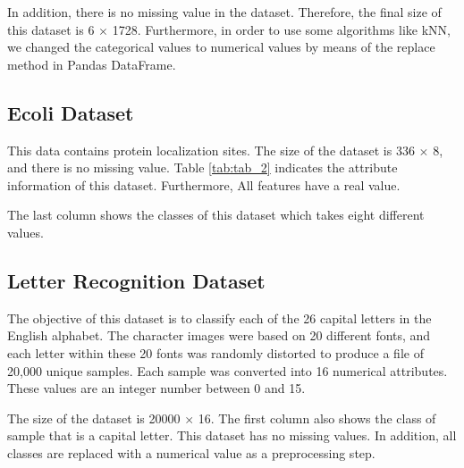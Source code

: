 \begin{table}[H]
\centering
\caption{The attribute information of Car Evaluation dataset.}
\label{tab:tab_1}

\end{table}

In addition, there is no missing value in the dataset. Therefore, the final size of this dataset is 6 $\times$ 1728. Furthermore, in order to use some algorithms like kNN, we changed the categorical values to numerical values by means of the replace method in Pandas DataFrame. 




\subsection{Ecoli Dataset}
This data contains protein localization sites. The size of the dataset is 336 $\times$ 8, and there is no missing value. Table \ref{tab:tab_2} indicates the attribute information of this dataset. Furthermore, All features have a real value.

\begin{table}[H]
\centering
\caption{The attribute information of Ecoli dataset.}
\label{tab:tab_2}

\end{table}

The last column shows the classes of this dataset which takes eight different values.




\subsection{Letter Recognition Dataset}

The objective of this dataset is to classify each of the 26 capital letters in the English alphabet. The character images were based on 20 different fonts, and each letter within these 20 fonts was randomly distorted to produce a file of 20,000 unique samples. Each sample was converted into 16 numerical attributes. These values are an integer number between 0 and 15. 

\begin{table}[H]
\centering
\caption{The attribute information of letter recognition dataset.}
\label{tab:tab_3}

\end{table}

The size of the dataset is 20000 $\times$ 16. The first column also shows the class of sample that is a capital letter. This dataset has no missing values. In addition, all classes are replaced with a numerical value as a preprocessing step.

